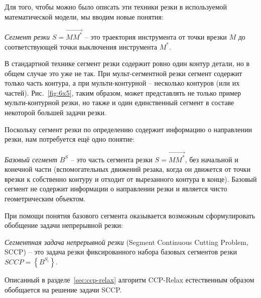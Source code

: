 \documentclass[10pt]{SPIIRAS_Proceedings}
\begin{document}
Для того,
чтобы можно было описать эти техники резки
в используемой математической модели,
мы вводим новые понятия:

{\it Сегмент резки}
$S = \overrightarrow{M M^*}$
-- это траектория инструмента
от точки врезки
$M$
до соответствующей точки выключения инструмента
$M^*$.

В стандартной технике
сегмент резки содержит ровно один контур детали,
но в общем случае это уже не так.
При мульт-сегментной резки сегмент содержит
только часть контура,
а при мульти-контурной -- несколько контуров
(или их частей).
Рис.~\ref{fig:6x5},
таким образом,
может представлять не только
пример мульти-контурной резки,
но также и один единственный сегмент
в составе некоторой большей задачи резки.

Поскольку сегмент резки по определению содержит
информацию о направлении резки,
нам потребуется ещё одно понятие:

{\it Базовый сегмент}
$B^S$
-- это часть сегмента резки
$S = \overrightarrow{M M^*}$,
без начальной и конечной части
(вспомогательных движений резака,
когда он движется от точки врезки
к собственно контуру и отходит
от вырезанного контура в конце).
Базовый сегмент не содержит информации
о направлении резки
и является чисто геометрическим объектом.

При помощи понятия базового сегмента
оказывается возможным сформулировать
обобщение задачи непрерывной резки:

{\it Сегментная задача непрерывной резки}
(Segment Continuous Cutting Problem, SCCP)
-- это задача резки фиксированного набора
базовых сегментов резки
$SCCP = \left\{B^{S_i}\right\}$.

Описанный в разделе~\ref{sec:ccp-relax}
алгоритм CCP-Relax
естественным образом обобщается
на решение задачи SCCP.
\end{document}
